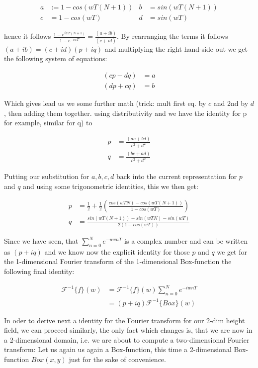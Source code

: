 \begin{align}
a& := 1 - cos(wT(N+1))&
b& =sin(wT(N+1))\\
c& =1-cos(wT)&
d& =sin(wT)
\end{align}

hence it follows $\frac{1-e^{iwT(N+1)}}{1-e^{-iwT}} = \frac{(a+ib)}{(c+id)}$.
By rearranging the terms it follows $(a+ib) = (c+id)(p+iq)$ and multiplying the right hand-side out we get the following system of equations:

\begin{align}
(cp-dq)& =a\\
(dp + cq)& =b
\end{align}

Which gives lead us we some further math (trick: mult first eq. by $c$ and 2nd by $d$, then adding them together. using distributivity and we have the identity for p for example, similar for q) to 

\begin{align}
p& =\frac{(ac+bd)}{c^2 + d^2}\\
q& =\frac{(bc+ad)}{c^2 + d^2}
\end{align}


Putting our substitution for $a, b, c, d$ back into the current representation for $p$ and $q$ and using some trigonometric identities, this we then get:

\begin{align}
p& =\frac{1}{2}+\frac{1}{2}\left(\frac{cos(wTN)-cos(wT(N+1))}{1-cos(wT)}\right)\\
q& =\frac{sin(wT(N+1))-sin(wTN)-sin(wT)}{2(1-cos(wT))}
\end{align}

Since we have seen, that $\sum_{n=0}^N e^{-uwnT}$ is a complex number and can be written as $(p+iq)$ and we know now the explicit identity for those $p$ and $q$ we get for the 1-dimensional Fourier transform of the 1-dimensional Box-function the following final identity:

\begin{align*}
\mathcal{F}^{-1}\{f\}(w)
& =\mathcal{F}^{-1}\{f\}(w) \sum_{n=0}^{N} e^{-iwnT} \\
& = (p+iq) \mathcal{F}^{-1}\{Box\}(w)  
\end{align*}

In oder to derive next a identity for the Fourier transform for our 2-dim height field, we can proceed similarly, the only fact which changes is, that we are now in a 2-dimensional domain, i.e. we are about to compute a two-dimensional Fourier transform:
Let us again us again a Box-function, this time a 2-dimensional Box-function $Box(x,y)$ just for the sake of convenience.

